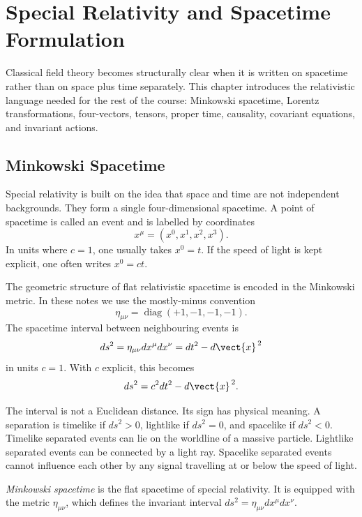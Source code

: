 \chapter{Special Relativity and Spacetime Formulation}

\begin{remarkbox}
Classical field theory becomes structurally clear when it is written on
spacetime rather than on space plus time separately. This chapter introduces the
relativistic language needed for the rest of the course: Minkowski spacetime,
Lorentz transformations, four-vectors, tensors, proper time, causality,
covariant equations, and invariant actions.
\end{remarkbox}

\section{Minkowski Spacetime}

Special relativity is built on the idea that space and time are not independent
backgrounds. They form a single four-dimensional spacetime. A point of
spacetime is called an event and is labelled by coordinates
\[
    x^\mu = (x^0,x^1,x^2,x^3).
\]
In units where \(c=1\), one usually takes \(x^0=t\). If the speed of light is
kept explicit, one often writes \(x^0=ct\).

The geometric structure of flat relativistic spacetime is encoded in the
Minkowski metric. In these notes we use the mostly-minus convention
\[
    \eta_{\mu\nu}=\operatorname{diag}(+1,-1,-1,-1).
\]
The spacetime interval between neighbouring events is
\[
    ds^2 = \eta_{\mu\nu}dx^\mu dx^\nu
    = dt^2 - d\vect{x}^{\,2}
\]
in units \(c=1\). With \(c\) explicit, this becomes
\[
    ds^2 = c^2dt^2-d\vect{x}^{\,2}.
\]

The interval is not a Euclidean distance. Its sign has physical meaning. A
separation is timelike if \(ds^2>0\), lightlike if \(ds^2=0\), and spacelike if
\(ds^2<0\). Timelike separated events can lie on the worldline of a massive
particle. Lightlike separated events can be connected by a light ray. Spacelike
separated events cannot influence each other by any signal travelling at or
below the speed of light.

\begin{definitionbox}
\emph{Minkowski spacetime} is the flat spacetime of special relativity. It is
equipped with the metric \(\eta_{\mu\nu}\), which defines the invariant interval
\(ds^2=\eta_{\mu\nu}dx^\mu dx^\nu\).
\end{definitionbox}


